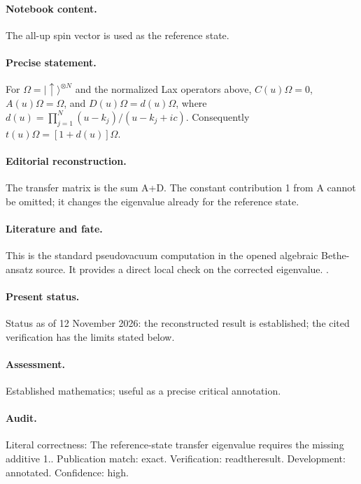 \paragraph{Notebook content.} The all-up spin vector is used as the reference state.

\paragraph{Precise statement.} For $\Omega=|\uparrow\rangle^{\otimes N}$ and the normalized Lax operators above, $C(u)\Omega=0$, $A(u)\Omega=\Omega$, and $D(u)\Omega=d(u)\Omega$, where $d(u)=\prod_{j=1}^N(u-k_j)/(u-k_j+ic)$. Consequently $t(u)\Omega=[1+d(u)]\Omega$.

\paragraph{Editorial reconstruction.} The transfer matrix is the sum A+D. The constant contribution 1 from A cannot be omitted; it changes the eigenvalue already for the reference state.

\paragraph{Literature and fate.} This is the standard pseudovacuum computation in the opened algebraic Bethe-ansatz source. It provides a direct local check on the corrected eigenvalue. \citep{faddeev1996bethe}.

\paragraph{Present status.} Status as of 12 November 2026: the reconstructed result is established; the cited verification has the limits stated below.

\paragraph{Assessment.} Established mathematics; useful as a precise critical annotation.

\paragraph{Audit.} Literal correctness: The reference-state transfer eigenvalue requires the missing additive 1.. Publication match: exact. Verification: readtheresult. Development: annotated. Confidence: high.

